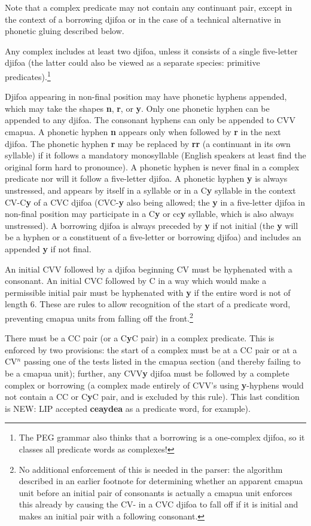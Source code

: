 \documentclass[12pt]{book}
\begin{document}
Note that a complex predicate may not contain any continuant pair, except in the context of a borrowing djifoa or in the case of a technical alternative in phonetic gluing described below.

Any complex includes at least two djifoa, unless it consists of a single five-letter djifoa (the latter could also be viewed as a separate species: primitive predicates).\footnote{The PEG grammar also thinks that a borrowing is a one-complex djifoa, so it classes all predicate words as complexes!}

Djifoa appearing in non-final position may have phonetic hyphens appended, which may take the shapes {\bf n}, {\bf r}, or {\bf y}.   Only one phonetic hyphen can be appended to any djifoa.  The consonant hyphens can only be appended to CVV cmapua.
A phonetic hyphen {\bf n} appears only when followed by {\bf r} in the next djifoa.  The phonetic hyphen {\bf r} may be replaced by {\bf rr} (a continuant in its own syllable) if it follows a mandatory monosyllable (English speakers at least find the original form hard to pronounce).  A phonetic hyphen is never final in a complex predicate nor will it follow a five-letter djifoa.  A phonetic hyphen {\bf y} is always unstressed, and appears by itself in a syllable or in a C{\bf y} syllable in the context CV-C{\bf y} of a CVC djifoa (CVC-{\bf y} also being allowed;  the {\bf y} in a five-letter djifoa in non-final position may participate in a C{\bf y} or cc{\bf y} syllable, which is also always unstressed).  A borrowing djifoa is always preceded by {\bf y} if not initial (the {\bf y} will be a hyphen or a constituent of a five-letter or borrowing djifoa) and includes an appended {\bf y} if not final.

An initial CVV followed by a djifoa beginning CV must be hyphenated with a consonant.  An initial CVC followed by C in a way which would make
a permissible initial pair must be hyphenated with {\bf y} if the entire word is not of length 6.  These are rules to allow recognition of the start of
a predicate word, preventing cmapua units from falling off the front.\footnote{No additional enforcement of this is needed in the parser:  the algorithm described in an earlier footnote for determining whether an apparent cmapua unit before an initial pair of consonants is actually a cmapua unit enforces this already by causing the CV- in a CVC djifoa to fall off if it is initial and makes an initial pair with a following consonant.}

There must be a CC pair (or a C{\bf y}C pair) in a complex predicate.  This is enforced by two provisions:  the start of a complex must be at a CC pair or
at a CV$^n$ passing one of the tests listed in the cmapua section (and thereby failing to be a cmapua unit);  further, any CVV{\bf y} djifoa must be followed by a complete complex or borrowing  (a complex made entirely of CVV's using {\bf y}-hyphens would not contain a CC or C{\bf y}C pair, and is excluded by this rule).  This last condition is NEW:
LIP accepted {\bf ceaydea} as a predicate word, for example).
\end{document}
